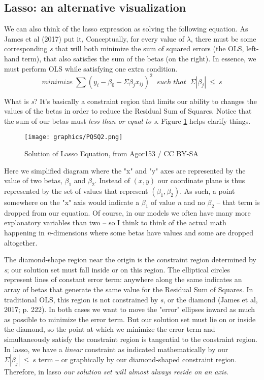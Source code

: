 \documentclass{article}                 %
\begin{document}
	\subsection{Lasso: an alternative visualization}
	We can also think of the lasso expression as solving the following equation. As James et al (2017) put it, Conceptually, for every value of $\lambda$, there must be some corresponding \textit{s} that will both minimize the sum of squared errors (the OLS, left-hand term), that also satisfies the sum of the betas (on the right). In essence, we must perform OLS while satisfying one extra condition.
	$$ minimize \; {\sum(y_i - \beta_0 - \Sigma\beta_{j}x_{ij} )^2} \; \; such \; that  \; \; \Sigma|\beta_j| \: \leq \: s $$

	What is \textit{s}? It's basically a constraint region that limits our ability to changes the values of the betas in order to reduce the Residual Sum of Squares. Notice that the sum of our betas must \textit{less than or equal to s}. Figure \ref{fig:f1} helps clarify things.


	   \begin{figure} [H]
		   \centering
		   \caption{Solution of Lasso Equation, from Agor153 / CC BY-SA}
		   \texttt{[image: graphics/PQSQ2.png]}
		   \label{fig:f1}
	   \end{figure}


Here we simplified diagram where the "x" and "y" axes are represented by the value of two betas, $ \beta_1 $ and $ \beta_2 $. Instead of $ (x,y) $ our coordinate plane is thus represented by the set of values that represent $ (\beta_1, \beta_2 ) $. As such, a point somewhere on the "x" axis would indicate a $\beta_1 $ of value \textit{n} and no $\beta_2$ -- that term is dropped from our equation. Of course, in our models we often have many more explanatory variables than two -- so I think to think of the actual math happening in \textit{n}-dimensions where some betas have values and some are dropped altogether.

The diamond-shape region near the origin is the constraint region determined by \textit{s}; our solution set must fall inside or on this region. The elliptical circles represent lines of constant error term: anywhere along the same indicates an array of betas that generate the same value for the Residual Sum of Squares. In traditional OLS, this region is not constrained by \textit{s}, or the diamond (James et al, 2017; p. 222). In both cases we want to move the "error" ellipses inward as much as possible to minimize the error term. But our solution set must lie on or inside the diamond, so the point at which we minimize the error term and simultaneously satisfy the constraint region is tangential to the constraint region. In lasso, we have a \emph{linear} constraint as indicated mathematically by our $ \Sigma|\beta_j| \: \leq \: s $ term -- or graphically by our diamond-shaped constraint region. Therefore, in lasso \textit{our solution set will almost always reside on an axis}.
\end{document}
